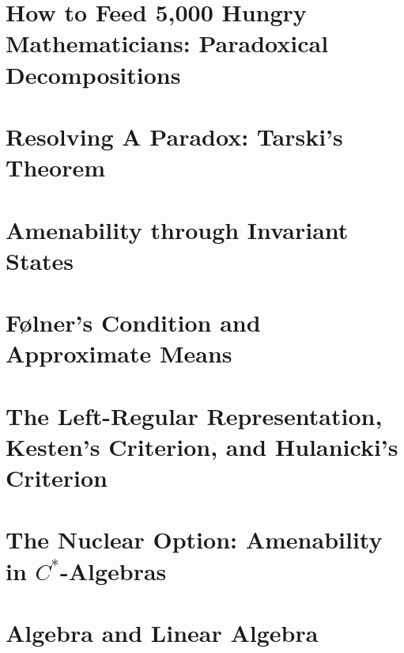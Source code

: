 \documentclass[10pt]{package2}
\begin{document}
\chapter{How to Feed 5,000 Hungry Mathematicians: Paradoxical Decompositions}\label{ch:paradoxical_decompositions}

\chapter{Resolving A Paradox: Tarski's Theorem}\label{ch:tarskis_theorem}

\chapter{Amenability through Invariant States}\label{ch:invariant_states}

\chapter{Følner's Condition and Approximate Means}\label{ch:folner_condition}

\chapter{The Left-Regular Representation, Kesten's Criterion, and Hulanicki's Criterion}\label{ch:left_regular_representation}
\chapter{The Nuclear Option: Amenability in \texorpdfstring{$C^{\ast}$-Algebras}{C*-Algebras}}\label{ch:nuclearity}
\appendix
\chapter{Algebra and Linear Algebra}\label{ch:algebra_and_linear_algebra}

\end{document}
